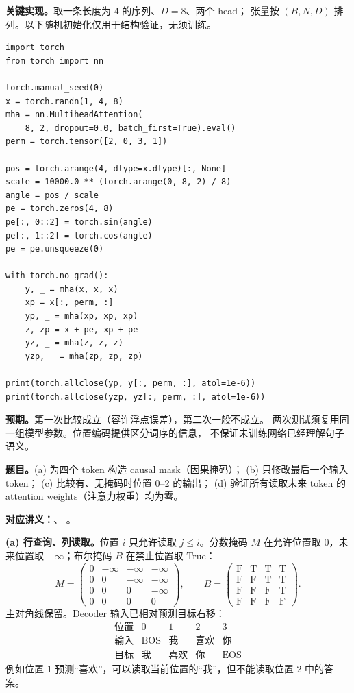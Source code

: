 \textbf{关键实现。}取一条长度为 4 的序列、$D=8$、两个 head；
张量按 $(B,N,D)$ 排列。以下随机初始化仅用于结构验证，无须训练。
\par
\begingroup
\linespread{1}\fontsize{9}{11}\selectfont
\begin{verbatim}
import torch
from torch import nn

torch.manual_seed(0)
x = torch.randn(1, 4, 8)
mha = nn.MultiheadAttention(
    8, 2, dropout=0.0, batch_first=True).eval()
perm = torch.tensor([2, 0, 3, 1])

pos = torch.arange(4, dtype=x.dtype)[:, None]
scale = 10000.0 ** (torch.arange(0, 8, 2) / 8)
angle = pos / scale
pe = torch.zeros(4, 8)
pe[:, 0::2] = torch.sin(angle)
pe[:, 1::2] = torch.cos(angle)
pe = pe.unsqueeze(0)

with torch.no_grad():
    y, _ = mha(x, x, x)
    xp = x[:, perm, :]
    yp, _ = mha(xp, xp, xp)
    z, zp = x + pe, xp + pe
    yz, _ = mha(z, z, z)
    yzp, _ = mha(zp, zp, zp)

print(torch.allclose(yp, y[:, perm, :], atol=1e-6))
print(torch.allclose(yzp, yz[:, perm, :], atol=1e-6))
\end{verbatim}
\endgroup
\textbf{预期。}第一次比较成立（容许浮点误差），第二次一般不成立。
两次测试须复用同一组模型参数。位置编码提供区分词序的信息，
不保证未训练网络已经理解句子语义。

\nopagebreak[4]
\textbf{题目。}(a) 为四个 token 构造 causal mask（因果掩码）；
(b) 只修改最后一个输入 token；
(c) 比较有、无掩码时位置 0--2 的输出；
(d) 验证所有读取未来 token 的 attention weights（注意力权重）均为零。

\textbf{对应讲义：}、
。

\textbf{(a) 行查询、列读取。}位置 $i$ 只允许读取 $j\le i$。分数掩码 $M$
在允许位置取 $0$，未来位置取 $-\infty$；布尔掩码 $B$ 在禁止位置取 True：
\[
 M=\begin{pmatrix}
 0&-\infty&-\infty&-\infty\\
 0&0&-\infty&-\infty\\
 0&0&0&-\infty\\
 0&0&0&0
 \end{pmatrix},
 \qquad
 B=\begin{pmatrix}
 \mathrm{F}&\mathrm{T}&\mathrm{T}&\mathrm{T}\\
 \mathrm{F}&\mathrm{F}&\mathrm{T}&\mathrm{T}\\
 \mathrm{F}&\mathrm{F}&\mathrm{F}&\mathrm{T}\\
 \mathrm{F}&\mathrm{F}&\mathrm{F}&\mathrm{F}
 \end{pmatrix}.
\]
主对角线保留。Decoder 输入已相对预测目标右移：
\[
 \begin{array}{c|cccc}
 \text{位置}&0&1&2&3\\ \hline
 \text{输入}&\mathrm{BOS}&\text{我}&\text{喜欢}&\text{你}\\
 \text{目标}&\text{我}&\text{喜欢}&\text{你}&\mathrm{EOS}
 \end{array}
\]
例如位置 1 预测“喜欢”，可以读取当前位置的“我”，但不能读取位置 2 中的答案。

